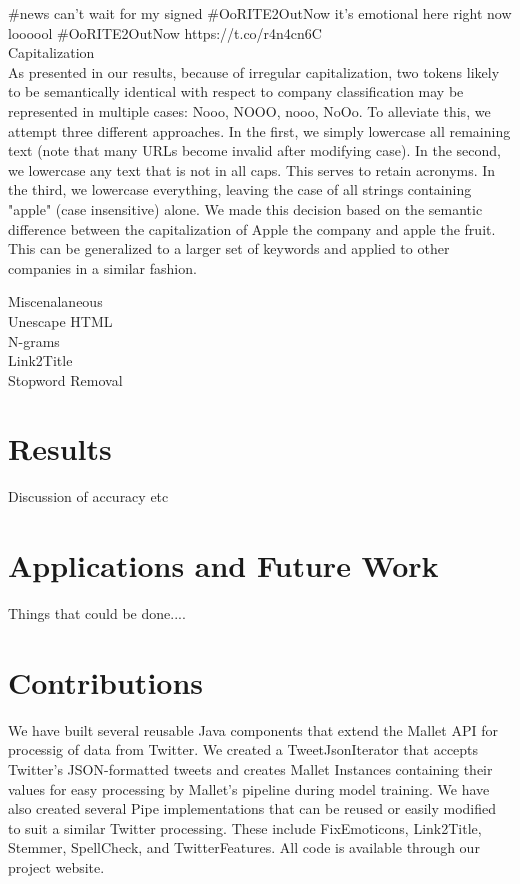 \documentclass[letterpaper]{article}
\begin{document}
#news can't wait for my signed #OoRITE2OutNow it's emotional here right now loooool #OoRITE2OutNow https://t.co/r4n4cn6C \\

Capitalization\\
As presented in our results, because of irregular capitalization, two tokens likely to be semantically identical with respect to company classification may be represented in multiple cases: {Nooo, NOOO, nooo, NoOo}. To alleviate this, we attempt three different approaches. In the first, we simply lowercase all remaining text (note that many URLs become invalid after modifying case). In the second, we lowercase any text that is not in all caps. This serves to retain acronyms. In the third, we lowercase everything, leaving the case of all strings containing "apple" (case insensitive) alone. We made this decision based on the semantic difference between the capitalization of Apple the company and apple the fruit. This can be generalized to a larger set of keywords and applied to other companies in a similar fashion. 

Miscenalaneous\\


Unescape HTML\\

N-grams\\

Link2Title\\

Stopword Removal\\


\section{Results}

Discussion of accuracy etc

\section{Applications and Future Work}

Things that could be done....

\section{Contributions}

We have built several reusable Java components that extend the Mallet API for processig of data from Twitter. We created a TweetJsonIterator that accepts Twitter's JSON-formatted tweets and creates Mallet Instances containing their values for easy processing by Mallet's pipeline during model training. We have also created several Pipe implementations that can be reused or easily modified to suit a similar Twitter processing. These include FixEmoticons, Link2Title, Stemmer, SpellCheck, and TwitterFeatures. All code is available through our project website.
\end{document}
